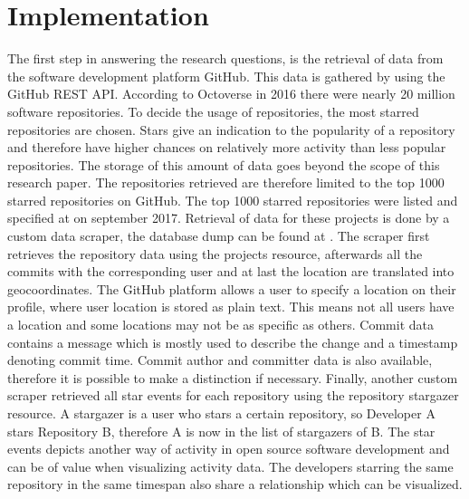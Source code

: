 \documentclass[acmtog, authorversion]{acmart}
\begin{document}
\section{Implementation}
The first step in answering the research questions, is the retrieval of data from the software development platform GitHub.
This data is gathered by using the GitHub REST API\cite{GHAPI}.
According to Octoverse \cite{GHOctoverse} in 2016 there were nearly 20 million software repositories. 
To decide the usage of repositories, the most starred repositories are chosen. Stars give an indication to the popularity of a repository and therefore have higher chances on relatively more activity than less popular repositories.
The storage of this amount of data goes beyond the scope of this research paper.
The repositories retrieved are therefore limited to the top 1000 starred repositories on GitHub.
The top 1000 starred repositories were listed and specified at \cite{gitstar} on september 2017.
Retrieval of data for these projects is done by a custom data scraper, the database dump can be found at  \cite{githubvisualizerovertime}.
The scraper first retrieves the repository data using the projects resource\cite{GHAPI}, afterwards all the commits with the corresponding user and at last the location are translated into geocoordinates.
The GitHub platform allows a user to specify a location on their profile, where user location is stored as plain text.
This means not all users have a location and some locations may not be as specific as others.
Commit data contains a message which is mostly used to describe the change and a timestamp denoting commit time.
Commit author and committer data is also available, therefore it is possible to make a distinction if necessary.
Finally, another custom scraper retrieved all star events for each repository using the repository stargazer resource\cite{GHAPI}.
A stargazer is a user who stars a certain repository, so Developer A stars Repository B, therefore A is now in the list of stargazers of B.
The star events depicts another way of activity in open source software development and can be of value when visualizing activity data. The developers starring the same repository in the same timespan also share a relationship which can be visualized.
\end{document}
